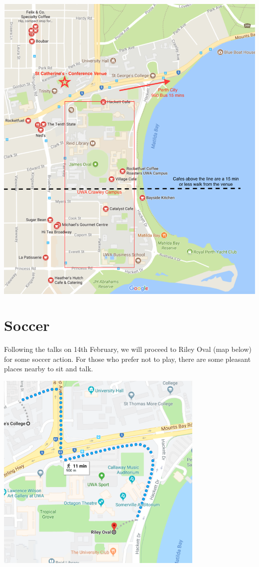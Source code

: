\documentclass[]{article}
\begin{document}
\begin{center}
\includegraphics[width=16cm]{images/Venue.png}
\end{center}

\section{Soccer}\label{soccer}

Following the talks on 14th February, we will proceed to Riley Oval (map
below) for some soccer action. For those who prefer not to play, there
are some pleasant places nearby to sit and talk.

\begin{center}
\includegraphics[width=10cm]{images/Soccer.png}
\end{center}
\end{document}
